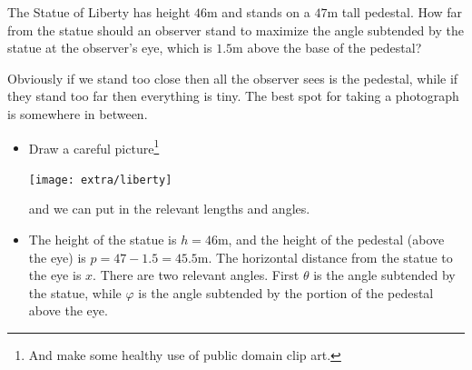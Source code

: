 \begin{eg}\label{APPglobalMaxMinG}
The Statue of Liberty has height $46$m and stands on a $47$m
tall pedestal. How far from the statue should an observer stand
to maximize the angle subtended by the statue at the observer's eye,
which is $1.5$m above the base of the pedestal?


\soln Obviously if we stand too close then all the observer sees is the
pedestal, while if they stand too far then everything is tiny. The best spot
for taking a photograph is somewhere in between.
\begin{itemize}
 \item Draw a careful picture\footnote{And make some healthy use of public
domain clip art.}
\begin{efig}
\begin{center}
   \texttt{[image: extra/liberty]}
\end{center}
\end{efig}
and we can put in the relevant lengths and angles.

\item The height of the statue is $h = 46$m, and the height of the pedestal (above the
eye) is $p = 47-1.5 = 45.5$m. The horizontal distance from the statue to the eye is $x$.
There are two relevant angles. First $\theta$ is the angle subtended by the statue, while
$\varphi$ is the angle subtended by the portion of the pedestal above the eye.


\end{itemize}
\end{eg}
